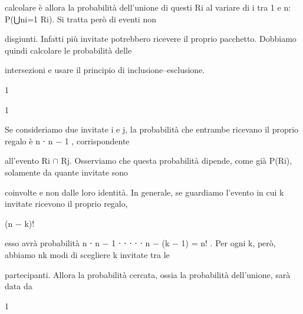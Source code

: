 \documentclass[a4paper,portrait,12pt]{article}
\begin{document}
\begin{flushleft}
calcolare \`{e} allora la probabilit\`{a} dell'unione di questi Ri al variare di i tra 1 e n: P(⋃ni=1 Ri). Si tratta per\`{o} di eventi non
\end{flushleft}


\begin{flushleft}
disgiunti. Infatti più invitate potrebbero ricevere il proprio pacchetto. Dobbiamo quindi calcolare le probabilit\`{a} delle
\end{flushleft}


\begin{flushleft}
intersezioni e usare il principio di inclusione--esclusione.
\end{flushleft}


1


1


\begin{flushleft}
Se consideriamo due invitate i e j, la probabilit\`{a} che entrambe ricevano il proprio regalo \`{e} n ⋅ n $-$ 1 , corrispondente
\end{flushleft}


\begin{flushleft}
all'evento Ri $\cap$ Rj. Osserviamo che questa probabilit\`{a} dipende, come gi\`{a} P(Ri), solamente da quante invitate sono
\end{flushleft}


\begin{flushleft}
coinvolte e non dalle loro identit\`{a}. In generale, se guardiamo l'evento in cui k invitate ricevono il proprio regalo,
\end{flushleft}


\begin{flushleft}
(n $-$ k)!
\end{flushleft}





\begin{flushleft}
esso avr\`{a} probabilit\`{a} n ⋅ n $-$ 1 ⋅ ⋅ ⋅ ⋅ ⋅ n $-$ (k $-$ 1) = n! . Per ogni k, per\`{o}, abbiamo nk modi di scegliere k invitate tra le
\end{flushleft}


\begin{flushleft}
partecipanti. Allora la probabilit\`{a} cercata, ossia la probabilit\`{a} dell'unione, sar\`{a} data da
\end{flushleft}


1
\end{document}
